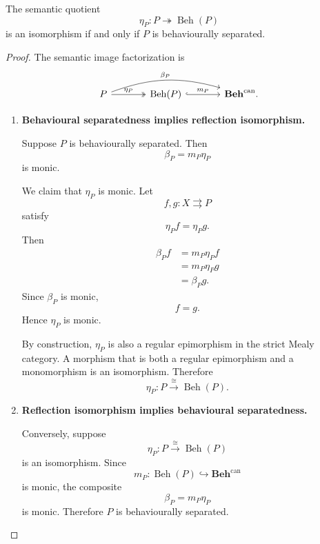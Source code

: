 \begin{corollary}
\label{cor:behaviourally-separated-reflection}
    The semantic quotient
    \[
        \eta_P:
        P\twoheadrightarrow\operatorname{Beh}(P)
    \]
    is an isomorphism if and only if \(P\) is behaviourally separated.
\end{corollary}
\begin{proof}
    The semantic image factorization is
    \[
    \begin{tikzcd}[column sep=large, row sep=large]
        P
            \arrow[r, two heads, "\eta_P"]
            \arrow[rr, bend left=18, "\beta_P"]
        &
        \operatorname{Beh}(P)
            \arrow[r, hook, "m_P"]
        &
        \mathbf{Beh}^{\mathrm{can}} .
    \end{tikzcd}
    \]

    \begin{enumerate}
        \item \textbf{Behavioural separatedness implies reflection
        isomorphism.}

        Suppose \(P\) is behaviourally separated. Then
        \[
            \beta_P=m_P\eta_P
        \]
        is monic.

        We claim that \(\eta_P\) is monic. Let
        \[
            f,g:X\rightrightarrows P
        \]
        satisfy
        \[
            \eta_Pf=\eta_Pg.
        \]
        Then
        \[
        \begin{aligned}
            \beta_Pf
            &=
            m_P\eta_Pf
            \\
            &=
            m_P\eta_Pg
            \\
            &=
            \beta_Pg.
        \end{aligned}
        \]
        Since \(\beta_P\) is monic,
        \[
            f=g.
        \]
        Hence \(\eta_P\) is monic.

        By construction, \(\eta_P\) is also a regular epimorphism in the
        strict Mealy category. A morphism that is both a regular epimorphism
        and a monomorphism is an isomorphism. Therefore
        \[
            \eta_P:
            P\overset{\cong}{\longrightarrow}\operatorname{Beh}(P).
        \]

        \item \textbf{Reflection isomorphism implies behavioural
        separatedness.}

        Conversely, suppose
        \[
            \eta_P:
            P\overset{\cong}{\longrightarrow}\operatorname{Beh}(P)
        \]
        is an isomorphism. Since
        \[
            m_P:
            \operatorname{Beh}(P)\hookrightarrow
            \mathbf{Beh}^{\mathrm{can}}
        \]
        is monic, the composite
        \[
            \beta_P=m_P\eta_P
        \]
        is monic. Therefore \(P\) is behaviourally separated.
    \end{enumerate}
\end{proof} 


